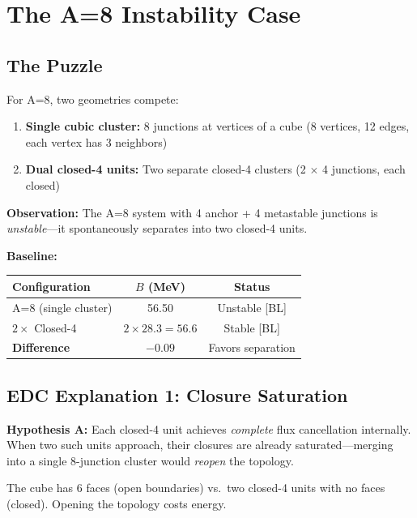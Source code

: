 \section{The A=8 Instability Case}
\label{sec:light:a8}

\subsection{The Puzzle}

For A=8, two geometries compete:

\begin{enumerate}
    \item \textbf{Single cubic cluster:} 8 junctions at vertices of a cube
          (8 vertices, 12 edges, each vertex has 3 neighbors)
    \item \textbf{Dual closed-4 units:} Two separate closed-4 clusters
          (2 $\times$ 4 junctions, each closed)
\end{enumerate}

\textbf{Observation:} The A=8 system with 4 anchor + 4 metastable junctions
is \emph{unstable}---it spontaneously separates into two closed-4 units.

\textbf{Baseline:}
\begin{center}
\begin{tabular}{lcc}
    \toprule
    Configuration & $B$ (MeV) & Status \\
    \midrule
    A=8 (single cluster) & 56.50 & Unstable [BL] \\
    $2 \times$ Closed-4 & $2 \times 28.3 = 56.6$ & Stable [BL] \\
    \midrule
    \textbf{Difference} & $-0.09$ & Favors separation \\
    \bottomrule
\end{tabular}
\end{center}

\subsection{EDC Explanation 1: Closure Saturation}

\begin{derivationbox}
    \textbf{Hypothesis A:} Each closed-4 unit achieves \emph{complete}
    flux cancellation internally. When two such units approach, their
    closures are already saturated---merging into a single 8-junction
    cluster would \emph{reopen} the topology.

    The cube has 6 faces (open boundaries) vs.\ two closed-4 units with
    no faces (closed). Opening the topology costs energy.
    \tagP
\end{derivationbox}

